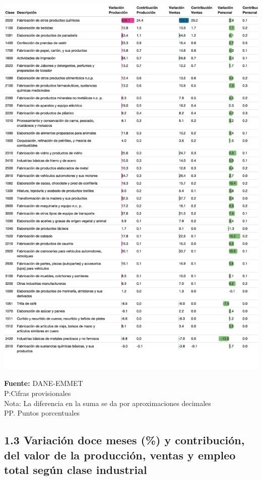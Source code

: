 \documentclass[
]{article}
\begin{document}
\includegraphics{boletin_files/figure-latex/tabla2_view-1.png}

\textbf{Fuente:} DANE-EMMET\\
P:Cifras provisionales\\
Nota: La diferencia en la suma se da por aproximaciones decimales\\
PP. Puntos porcentuales\\

\hypertarget{variaciuxf3n-doce-meses-y-contribuciuxf3n-del-valor-de-la-producciuxf3n-ventas-y-empleo-total-seguxfan-clase-industrial}{%
\subsection{1.3 Variación doce meses (\%) y contribución, del valor de
la producción, ventas y empleo total según clase
industrial}\label{variaciuxf3n-doce-meses-y-contribuciuxf3n-del-valor-de-la-producciuxf3n-ventas-y-empleo-total-seguxfan-clase-industrial}}
\end{document}
